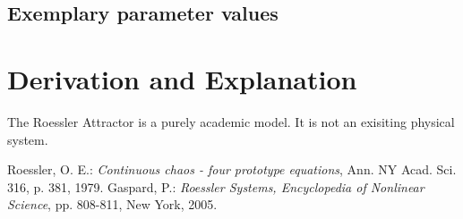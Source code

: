 \documentclass[10pt,a4paper]{article}
\begin{document}
	\subsection{Exemplary parameter values}
	

	
	\section{Derivation and Explanation} %
	
	The Roessler Attractor is a purely academic model. It is not an exisiting physical system.
	
	
	\begin{thebibliography}{10}		
		Roessler, O. E.: 
		\textit{Continuous chaos - four prototype equations}, Ann. NY Acad. Sci. 316, p. 381, 1979.
		Gaspard, P.: 
		\textit{Roessler Systems, Encyclopedia of Nonlinear Science}, pp. 808-811, New York, 2005.
	\end{thebibliography}
\end{document}
